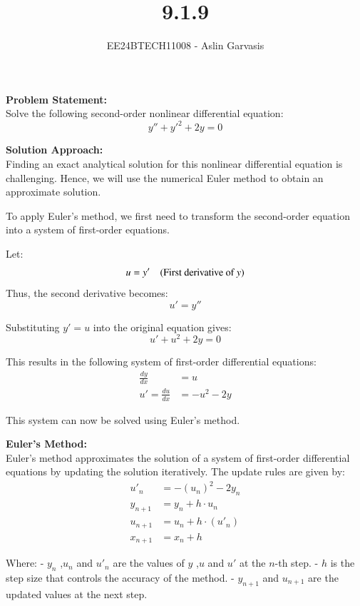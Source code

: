 \documentclass[journal]{IEEEtran}
\begin{document}
\title{9.1.9}
\author{EE24BTECH11008 - Aslin Garvasis}
\maketitle

\textbf{Problem Statement:}\\
Solve the following second-order nonlinear differential equation:
\begin{equation}
y'' + y'^2 + 2y = 0
\end{equation}

\textbf{Solution Approach:}\\
Finding an exact analytical solution for this nonlinear differential equation is challenging. Hence, we will use the numerical Euler method to obtain an approximate solution.

To apply Euler’s method, we first need to transform the second-order equation into a system of first-order equations.

Let:
\[
u = y' \quad \text{(First derivative of \( y \))}
\]
Thus, the second derivative becomes:
\[
u' = y''
\]

Substituting \( y' = u \) into the original equation gives:
\begin{equation}
u' + u^2 + 2y = 0
\end{equation}

This results in the following system of first-order differential equations:
\begin{align}
\frac{dy}{dx} &= u \\
u' =\frac{du}{dx} &= -u^2 - 2y
\end{align}

This system can now be solved using Euler's method.

\textbf{Euler’s Method:}\\
Euler's method approximates the solution of a system of first-order differential equations by updating the solution iteratively. The update rules are given by:
\begin{align}
u'_{n} &= -(u_n)^2 - 2y_n \\	
y_{n+1} &= y_n + h \cdot u_n \\
u_{n+1} &= u_n + h \cdot (u'_n) \\
x_{n+1} &= x_n + h 
\end{align}

Where:
- \( y_n \) ,\( u_n \) and \( u'_n \) are the values of \( y \) ,\( u \) and \( u' \) at the \( n \)-th step.
- \( h \) is the step size that controls the accuracy of the method.
- \( y_{n+1} \) and \( u_{n+1} \) are the updated values at the next step.
\end{document}
